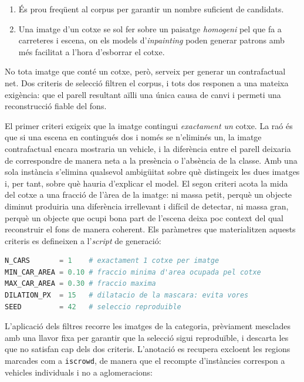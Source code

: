 \begin{enumerate}
\item És prou freqüent al corpus per garantir un nombre suficient de candidats.
\item Una imatge d'un cotxe se sol fer sobre un paisatge \emph{homogeni} pel que fa a carreteres i escena, on els models d'\emph{inpainting} poden generar patrons amb més facilitat a l'hora d'esborrar el cotxe.
\end{enumerate}

No tota imatge que conté un cotxe, però, serveix per generar un contrafactual net. Dos criteris de selecció filtren el corpus, i tots dos responen a una mateixa exigència: que el parell resultant aïlli una única causa de canvi i permeti una reconstrucció fiable del fons.

El primer criteri exigeix que la imatge contingui \emph{exactament un} cotxe. La raó és que si una escena en contingués dos i només se n'eliminés un, la imatge contrafactual encara mostraria un vehicle, i la diferència entre el parell deixaria de correspondre de manera neta a la presència o l'absència de la classe. Amb una sola instància s'elimina qualsevol ambigüitat sobre què distingeix les dues imatges i, per tant, sobre què hauria d'explicar el model. El segon criteri acota la mida del cotxe a una fracció de l'àrea de la imatge: ni massa petit, perquè un objecte diminut produiria una diferència irrellevant i difícil de detectar, ni massa gran, perquè un objecte que ocupi bona part de l'escena deixa poc context del qual reconstruir el fons de manera coherent. Els paràmetres que materialitzen aquests criteris es defineixen a l'\emph{script} de generació:

\begin{lstlisting}[language=Python, caption={Paràmetres de selecció i preparació.}, label={lst:params}]
N_CARS       = 1    # exactament 1 cotxe per imatge
MIN_CAR_AREA = 0.10 # fraccio minima d'area ocupada pel cotxe
MAX_CAR_AREA = 0.30 # fraccio maxima
DILATION_PX  = 15   # dilatacio de la mascara: evita vores
SEED         = 42   # seleccio reproduible
\end{lstlisting}

L'aplicació dels filtres recorre les imatges de la categoria, prèviament mesclades amb una llavor fixa per garantir que la selecció sigui reproduïble, i descarta les que no satisfan cap dels dos criteris. L'anotació es recupera excloent les regions marcades com a \texttt{iscrowd}, de manera que el recompte d'instàncies correspon a vehicles individuals i no a aglomeracions:

